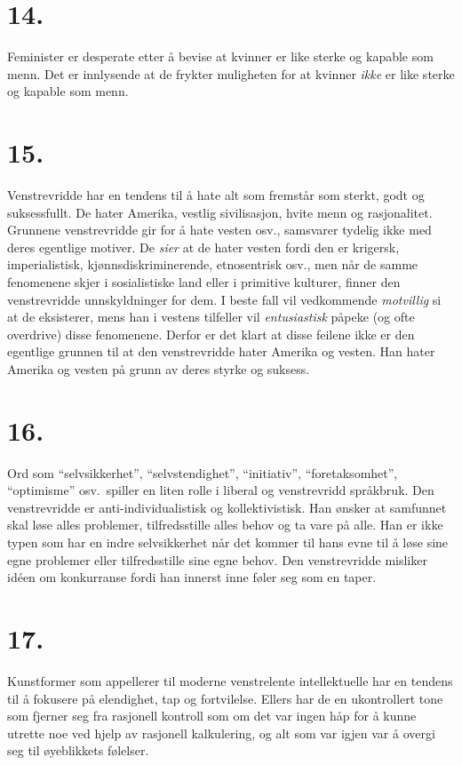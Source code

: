 \documentclass[oneside]{book}
\begin{document}
\section*{14.}
Feminister er desperate etter å bevise at kvinner er like sterke og kapable som
menn. Det er innlysende at de frykter muligheten for at kvinner \emph{ikke} er
like sterke og kapable som menn.

\section*{15.}
Venstrevridde har en tendens til å hate alt som fremstår som sterkt, godt og
suksessfullt. De hater Amerika, vestlig sivilisasjon, hvite menn og
rasjonalitet. Grunnene venstrevridde gir for å hate vesten osv., samsvarer
tydelig ikke med deres egentlige motiver. De \emph{sier} at de hater vesten
fordi den er krigersk, imperialistisk, kjønnsdiskriminerende, etnosentrisk
osv., men når de samme fenomenene skjer i sosialistiske land eller i primitive
kulturer, finner den venstrevridde unnskyldninger for dem. I beste fall vil
vedkommende \emph{motvillig} si at de eksisterer, mens han i vestens tilfeller
vil \emph{entusiastisk} påpeke (og ofte overdrive) disse fenomenene. Derfor er
det klart at disse feilene ikke er den egentlige grunnen til at den
venstrevridde hater Amerika og vesten. Han hater Amerika og vesten på grunn av
deres styrke og suksess.

\section*{16.}
Ord som ``selvsikkerhet'', ``selvstendighet'', ``initiativ'',
``foretaksomhet'', ``optimisme'' osv.\ spiller en liten rolle i liberal og
venstrevridd språkbruk. Den venstrevridde er anti-individualistisk og
kollektivistisk. Han ønsker at samfunnet skal løse alles problemer,
tilfredsstille alles behov og ta vare på alle. Han er ikke typen som har en
indre selvsikkerhet når det kommer til hans evne til å løse sine egne problemer
eller tilfredsstille sine egne behov. Den venstrevridde misliker idéen om
konkurranse fordi han innerst inne føler seg som en taper.

\section*{17.}
Kunstformer som appellerer til moderne venstrelente intellektuelle har en
tendens til å fokusere på elendighet, tap og fortvilelse. Ellers har de en
ukontrollert tone som fjerner seg fra rasjonell kontroll som om det var ingen
håp for å kunne utrette noe ved hjelp av rasjonell kalkulering, og alt som var
igjen var å overgi seg til øyeblikkets følelser.
\end{document}
